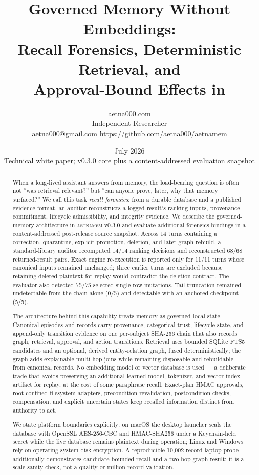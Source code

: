 \documentclass[10pt,twocolumn]{article}
\title{\vspace{-1.3em}\textbf{Governed Memory Without Embeddings:}\\
\textbf{Recall Forensics, Deterministic Retrieval, and\\Approval-Bound Effects in \system}}
\author{aetna000.com\\\small Independent Researcher\\
\small \href{mailto:aetna000@gmail.com}{aetna000@gmail.com} \quad
\url{https://github.com/aetna000/aetnamem}}
\date{July 2026\\\small Technical white paper; v0.3.0 core plus a content-addressed evaluation snapshot}
\newcommand{\system}{\textsc{aetnamem}}
\begin{document}
\maketitle

\begin{abstract}
When a long-lived assistant answers from memory, the load-bearing question is often not ``was retrieval relevant?'' but ``can anyone prove, later, why that memory surfaced?'' We call this task \emph{recall forensics}: from a durable database and a published evidence format, an auditor reconstructs a logged result's ranking inputs, provenance commitment, lifecycle admissibility, and integrity evidence. We describe the governed-memory architecture in \system{} v0.3.0 and evaluate additional forensics bindings in a content-addressed post-release source snapshot. Across 14 turns containing a correction, quarantine, explicit promotion, deletion, and later graph rebuild, a standard-library auditor recomputed 14/14 ranking decisions and reconstructed 68/68 returned-result pairs. Exact engine re-execution is reported only for 11/11 turns whose canonical inputs remained unchanged; three earlier turns are excluded because retaining deleted plaintext for replay would contradict the deletion contract. The evaluator also detected 75/75 selected single-row mutations. Tail truncation remained undetectable from the chain alone (0/5) and detectable with an anchored checkpoint (5/5).

The architecture behind this capability treats memory as governed local state. Canonical episodes and records carry provenance, categorical trust, lifecycle state, and append-only transition evidence on one per-subject SHA-256 chain that also records graph, retrieval, approval, and action transitions. Retrieval uses bounded SQLite FTS5 candidates and an optional, derived entity-relation graph, fused deterministically; the graph adds explainable multi-hop joins while remaining disposable and rebuildable from canonical records. No embedding model or vector database is used --- a deliberate trade that avoids preserving an additional learned model, tokenizer, and vector-index artifact for replay, at the cost of some paraphrase recall. Exact-plan HMAC approvals, root-confined filesystem adapters, precondition revalidation, postcondition checks, compensation, and explicit uncertain states keep recalled information distinct from authority to act.

We state platform boundaries explicitly: on macOS the desktop launcher seals the database with OpenSSL AES-256-CBC and HMAC-SHA256 under a Keychain-held secret while the live database remains plaintext during operation; Linux and Windows rely on operating-system disk encryption. A reproducible 10,002-record laptop probe additionally demonstrates candidate-bounded recall and a two-hop graph result; it is a scale sanity check, not a quality or million-record validation.
\end{abstract}
\end{document}
